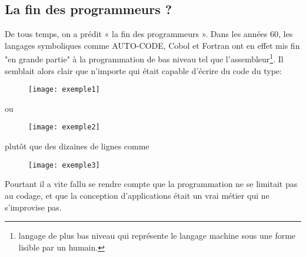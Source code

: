 \documentclass[12pt,a4paper]{article}
\begin{document}
\subsection{La fin des programmeurs ?}
De tous temps, on a prédit « la fin des programmeurs ». Dans les 
années 60, les langages symboliques comme AUTO-CODE, Cobol et Fortran
ont  en effet mis fin "en grande partie" à la programmation de bas 
niveau tel que l'assembleur\footnote{langage de plus bas niveau qui 
représente le langage machine sous une forme lisible par un humain.}.
Il semblait alors clair que n'importe qui était capable d'écrire du 
code du type:
\begin{center}
\begin{figure}[ht]
 \centering
  \texttt{[image: exemple1]}
\end{figure}
  ou
\newpage
\begin{figure}[ht]
  \centering
  \texttt{[image: exemple2]}
\end{figure}  
  plutôt que des dizaines de lignes comme\\
\begin{figure}[ht]
\centering
  \texttt{[image: exemple3]}
\end{figure}
\end{center}         
Pourtant il a vite fallu se rendre compte que la programmation ne se
limitait pas au codage, et que la conception d'applications était un
vrai métier qui ne s'improvise pas.\\
\end{document}
